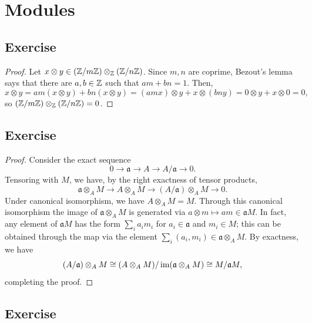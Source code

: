 \section{Modules}

\subsection{Exercise}\label{2.1} %

\begin{proof}
Let $x \otimes y \in (\mathbb{Z}/m\mathbb{Z}) \otimes_{\mathbb{Z}} (\mathbb{Z}/n\mathbb{Z})$. Since $m, n$ are coprime, Bezout's lemma says that there are $a, b \in \mathbb{Z}$ such that $am + bn = 1$. Then,
$$x \otimes y = am(x \otimes y) + bn(x \otimes y) = (amx) \otimes y + x \otimes (bny) = 0 \otimes y + x \otimes 0 = 0,$$
so $(\mathbb{Z}/m\mathbb{Z}) \otimes_{\mathbb{Z}} (\mathbb{Z}/n\mathbb{Z}) = 0$.
\end{proof}

\subsection{Exercise}\label{2.2} %

\begin{proof}
Consider the exact sequence
$$0 \to \mathfrak{a} \to A \to A/\mathfrak{a} \to 0.$$
Tensoring with $M$, we have, by the right exactness of tensor products,
$$\mathfrak{a} \otimes_A M \to A \otimes_A M \to (A/\mathfrak{a})\otimes_A M \to 0.$$
Under canonical isomorphism, we have $A \otimes_A M = M$. Through this canonical isomorphism the image of $\mathfrak{a} \otimes_A M$ is generated via
$a \otimes m \mapsto am \in \mathfrak{a}M$. In fact, any element of $\mathfrak{a}M$ has the form $\sum_i a_im_i$ for $a_i \in \mathfrak{a}$ and
$m_i \in M$; this can be obtained through the map via the element $\sum_i(a_i,m_i) \in \mathfrak{a} \otimes_A M$. By exactness, we have
$$(A/\mathfrak{a})\otimes_A M \cong (A \otimes_A M)/\operatorname{im}(\mathfrak{a} \otimes_A M) \cong M / \mathfrak{a}M,$$
completing the proof.
\end{proof}

\subsection{Exercise}\label{2.3} %

